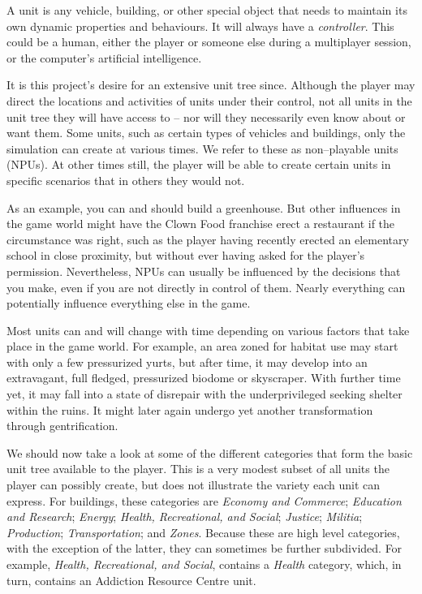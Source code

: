 

A unit is any vehicle, building, or other special object that needs to maintain its own dynamic properties and behaviours. It will always have a {\it controller}. This could be a human, either the player or someone else during a multiplayer session, or the computer's artificial intelligence.

It is this project's desire for an extensive unit tree since. Although the player may direct the locations and activities of units under their control, not all units in the unit tree they will have access to -- nor will they necessarily even know about or want them. Some units, such as certain types of vehicles and buildings, only the simulation can create at various times. We refer to these as non--playable units (NPUs). At other times still, the player will be able to create certain units in specific scenarios that in others they would not.

As an example, you can and should build a greenhouse. But other influences in the game world might have the Clown Food franchise erect a restaurant if the circumstance was right, such as the player having recently erected an elementary school in close proximity, but without ever having asked for the player's permission. Nevertheless, NPUs can usually be influenced by the decisions that you make, even if you are not directly in control of them. Nearly everything can potentially influence everything else in the game.

Most units can and will change with time depending on various factors that take place in the game world. For example, an area zoned for habitat use may start with only a few pressurized yurts, but after time, it may develop into an extravagant, full fledged, pressurized biodome or skyscraper. With further time yet, it may fall into a state of disrepair with the underprivileged seeking shelter within the ruins. It might later again undergo yet another transformation through gentrification.

We should now take a look at some of the different categories that form the basic unit tree available to the player. This is a very modest subset of all units the player can possibly create, but does not illustrate the variety each unit can express. For buildings, these categories are {\it Economy and Commerce}; {\it Education and Research}; {\it Energy}; {\it Health, Recreational, and Social}; {\it Justice}; {\it Militia}; {\it Production}; {\it Transportation}; and {\it Zones}. Because these are high level categories, with the exception of the latter, they can sometimes be further subdivided. For example, {\it Health, Recreational, and Social}, contains a {\it Health} category, which, in turn, contains an Addiction Resource Centre unit.

